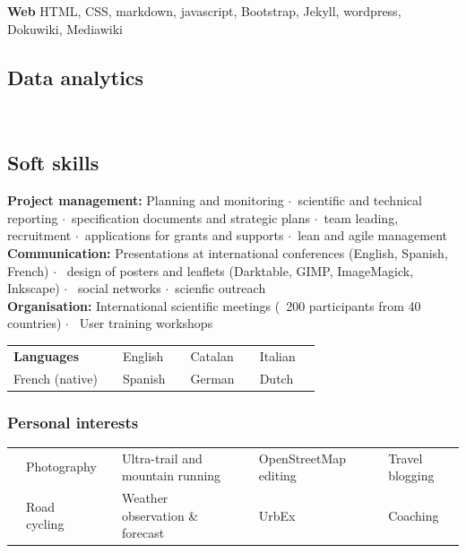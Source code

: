\documentclass[svgnames]{article}
\newcommand{\fourstar}{\footnotesize \textcolor{CVorange}{\faStar\faStar\faStar\faStar}}
\newcommand{\threestar}{\footnotesize \textcolor{CVorange}{\faStar\faStar\faStar}\faStarO}
\newcommand{\twostar}{\footnotesize \textcolor{CVorange}{\faStar\faStar}\faStarO\faStarO}
\newcommand{\onestar}{\footnotesize \textcolor{CVorange}{\faStar}\faStarO\faStarO\faStarO}
\newcommand{\halfstar}{\footnotesize \textcolor{CVorange}{\faStarHalfO}\faStarO\faStarO\faStarO}
\newcommand{\sepa}{$\cdot$~}
\begin{document}
\noindent \textbf{Web} HTML, CSS, markdown, javascript, Bootstrap, Jekyll, wordpress, Dokuwiki, Mediawiki

\subsection*{Data analytics}

     \\ 
    


\subsection*{Soft skills}
\textbf{Project management:} Planning and monitoring \sepa scientific and technical reporting \sepa specification documents and strategic plans \sepa team leading, recruitment \sepa applications for grants and supports \sepa lean and agile management\\
\textbf{Communication:} Presentations at international conferences (English, Spanish, French) $\cdot$~ design of posters and leaflets (Darktable, GIMP, ImageMagick, Inkscape) $\cdot$~ social networks \sepa scienfic outreach\\ 
\textbf{Organisation:} International scientific meetings (~200 participants from 40 countries) $\cdot$~ User	 training workshops\\
\begin{tabularx}{\textwidth}{@{}lrlrlrlr @{}}
\textbf{Languages }	& \dotfill	 	& English 	& \threestar 	& Catalan 	& \twostar	& Italian	& \onestar\\
French (native)		& \fourstar 	& Spanish	& \threestar	& German	& \onestar	& Dutch 	& \halfstar	\\			
\end{tabularx}

\subsubsection*{Personal interests}

\begin{tabular}{rlrlrlrl}
\faCameraRetro	& Photography & \faMapSigns & Ultra-trail and mountain running 		& \faMapMarker & OpenStreetMap editing	& \faWordpress &Travel blogging \\
\Bicycle		& Road cycling& \faCloud 	 & Weather observation \& forecast	& \Industry    & UrbEx 					& & Coaching  			\\
\end{tabular}
	
\end{document}
